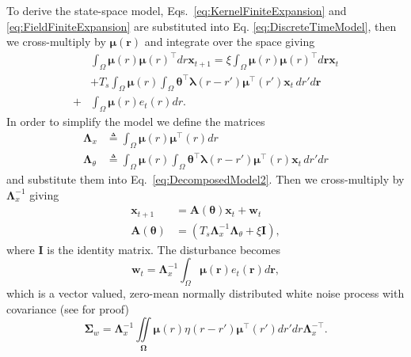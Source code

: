\documentclass[journal,a4paper]{IEEEtran}
\begin{document}
To derive the state-space model, Eqs.~\eqref{eq:KernelFiniteExpansion} and \eqref{eq:FieldFiniteExpansion} are substituted into Eq. \eqref{eq:DiscreteTimeModel}, then we cross-multiply by $\boldsymbol\mu\left(\mathbf r\right)$ and integrate over the space giving
\begin{align}\label{eq:DecomposedModel2} 
	&\int_{\Omega} \boldsymbol\mu  \left(r\right)\boldsymbol\mu\left(r\right)^\top  dr\mathbf{x}_{t+1}= 
	\xi\int_{\Omega}\boldsymbol\mu\left(r\right)\boldsymbol\mu\left(r\right)^\top d\mathbf{r}\mathbf{x}_t \nonumber \\
	&+T_s \int_{\Omega}\boldsymbol\mu\left(r\right) \int_\Omega { 
	   \boldsymbol\theta^\top\boldsymbol\lambda\left(r-r'\right)
	    \boldsymbol\mu^\top\left(r'\right)\mathbf{x}_t 
	\, dr'd\mathbf{r}} \nonumber \\
	+& \int_{\Omega}\boldsymbol\mu\left(r\right)e_t\left(r\right)dr.
\end{align}
In order to simplify the model we define the matrices
\begin{align}\label{eq:Lambdax}
 \mathbf{\Lambda}_{x} &\triangleq \int_{\Omega}\boldsymbol\mu\left(r\right)\boldsymbol\mu^\top\left(r\right) dr \\
\label{eq:Lambdatheta}
 \mathbf{\Lambda}_{\theta} &\triangleq \int_{\Omega}\boldsymbol\mu\left(r\right) \int_\Omega { 
	   \boldsymbol\theta^\top\boldsymbol\lambda\left(r-r'\right)
	    \boldsymbol\mu^\top\left(r\right)\mathbf{x}_t 
	\, dr'dr}
\end{align}
and substitute them into Eq.~\eqref{eq:DecomposedModel2}. Then we cross-multiply by $\mathbf{\Lambda}_{x}^{-1}$ giving
\begin{align}\label{eq:StateEquation}
 \mathbf x_{t+1} &=\mathbf A(\boldsymbol \theta) \mathbf x_t+ \mathbf w_t \\
\label{eq:A_theta}
 \mathbf A(\boldsymbol \theta) &= (T_s\mathbf{\Lambda}_{x}^{-1}\mathbf{\Lambda}_{\theta}+\xi\mathbf I),
\end{align}
where $\mathbf I$ is the identity matrix. The disturbance becomes 
\begin{equation}\label{eq:Disturbance}
\mathbf w_t= \mathbf{\Lambda}_{x}^{-1}\int_{\Omega}\boldsymbol\mu \left(\mathbf{r}\right)e_t\left(\mathbf{r}\right)d\mathbf{r},
\end{equation}
which is a vector valued, zero-mean normally distributed white noise process with covariance (see \cite{Scerri2009} for proof)
\begin{equation}
\boldsymbol\Sigma_w =\mathbf{\Lambda}_{x}^{-1}\iint\limits_{\boldsymbol\Omega}\boldsymbol\mu\left(r\right) \eta\left(r-r'\right)\boldsymbol\mu^{\top}\left(r'\right)dr'dr\mathbf{\Lambda}_{x}^{-\top}.
\end{equation}
\end{document}
